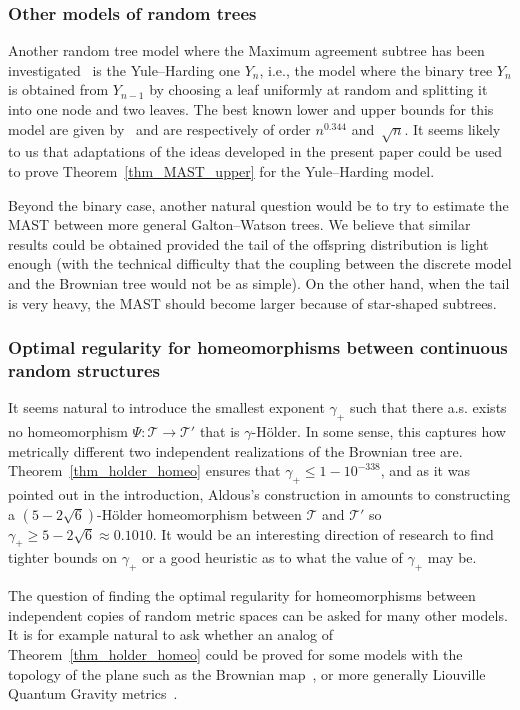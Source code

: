 \documentclass[11pt]{article}
\newcommand{\ie}{i.e.,\xspace}
\newcommand{\Subsubsection}{\subsubsection}
\newcommand{\Tt}{\mathcal{T}}
\theoremstyle{plain}
\theoremstyle{definition}
\numberwithin{equation}{section}
\begin{document}
\subsubsection*{Other models of random trees}
Another random tree model where the Maximum agreement subtree has been investigated~\cite{bryant_size_2003, bernstein_bounds_2015} is the Yule--Harding one $Y_n$, \ie the model where the binary tree $Y_n$ is obtained from $Y_{n-1}$ by choosing a leaf uniformly at random and splitting it into one node and two leaves. The best known lower and upper bounds for this model are given by~\cite{bernstein_bounds_2015} and are respectively of order $n^{0.344}$ and~$\sqrt{n}$.
It seems likely to us that adaptations of the ideas developed in the present paper could be used to prove Theorem~\ref{thm_MAST_upper} for the Yule--Harding model.

Beyond the binary case, another natural question would be to try to estimate the MAST between more general Galton--Watson trees.
We believe that similar results could be obtained provided the tail of the offspring distribution is light enough (with the technical difficulty that the coupling between the discrete model and the Brownian tree would not be as simple).
On the other hand, when the tail is very heavy, the MAST should become larger because of star-shaped subtrees.

\Subsubsection*{Optimal regularity for homeomorphisms between continuous random structures}
It seems natural to introduce the smallest exponent $\gamma_+$ such that there a.s. exists no homeomorphism $\Psi : \Tt\rightarrow \Tt'$ that is $\gamma$-Hölder. In some sense, this captures how metrically different two independent realizations of the Brownian tree are.
Theorem~\ref{thm_holder_homeo} ensures that $\gamma_{+} \leq 1-10^{-338}$, and as it was pointed out in the introduction, Aldous's construction in \cite{aldous_largest_2022} amounts to constructing a $(5-2\sqrt{6})$-Hölder homeomorphism between $\Tt$ and $\Tt'$ so $\gamma_{+}\geq 5-2\sqrt{6} \approx 0.1010$.
It would be an interesting direction of research to find tighter bounds on $\gamma_{+}$ or a good heuristic as to what the value of $\gamma_{+}$ may be.

The question of finding the optimal regularity for homeomorphisms between independent copies of random metric spaces can be asked for many other models.
It is for example natural to ask whether an analog of Theorem~\ref{thm_holder_homeo} could be proved for some models with the topology of the plane such as the Brownian map~\cite{LG11, Mie11}, or more generally Liouville Quantum Gravity metrics~\cite{GM21}.
\end{document}
